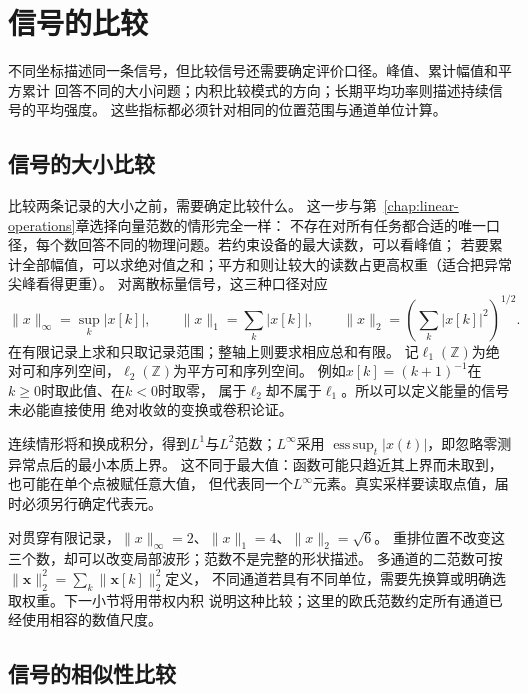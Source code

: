 \section{信号的比较}
\label{sec:signal-comparison}

不同坐标描述同一条信号，但比较信号还需要确定评价口径。峰值、累计幅值和平方累计
回答不同的大小问题；内积比较模式的方向；长期平均功率则描述持续信号的平均强度。
这些指标都必须针对相同的位置范围与通道单位计算。

\subsection{信号的大小比较}

比较两条记录的大小之前，需要确定比较什么。
这一步与第~\ref{chap:linear-operations}章选择向量范数的情形完全一样：
不存在对所有任务都合适的唯一口径，每个数回答不同的物理问题。若约束设备的最大读数，可以看峰值；
若要累计全部幅值，可以求绝对值之和；平方和则让较大的读数占更高权重（适合把异常尖峰看得更重）。
对离散标量信号，这三种口径对应
\[
  \|x\|_\infty=\sup_k|x[k]|,\qquad
  \|x\|_1=\sum_k|x[k]|,\qquad
  \|x\|_2=\left(\sum_k|x[k]|^2\right)^{1/2}.
\]
在有限记录上求和只取记录范围；整轴上则要求相应总和有限。
记$\ell_1(\mathbb Z)$为绝对可和序列空间，$\ell_2(\mathbb Z)$为平方可和序列空间。
例如$x[k]=(k+1)^{-1}$在$k\geq0$时取此值、在$k<0$时取零，
属于$\ell_2$却不属于$\ell_1$。所以可以定义能量的信号未必能直接使用
绝对收敛的变换或卷积论证。

连续情形将和换成积分，得到$L^1$与$L^2$范数；$L^\infty$采用
$\operatorname*{ess\,sup}_t|x(t)|$，即忽略零测异常点后的最小本质上界。
这不同于最大值：函数可能只趋近其上界而未取到，也可能在单个点被赋任意大值，
但代表同一个$L^\infty$元素。真实采样要读取点值，届时必须另行确定代表元。

对贯穿有限记录，$\|x\|_\infty=2$、$\|x\|_1=4$、$\|x\|_2=\sqrt6$。
重排位置不改变这三个数，却可以改变局部波形；范数不是完整的形状描述。
多通道的二范数可按
$\|\bm x\|_2^2=\sum_k\|\bm x[k]\|_2^2$定义，
不同通道若具有不同单位，需要先换算或明确选取权重。下一小节将用带权内积
说明这种比较；这里的欧氏范数约定所有通道已经使用相容的数值尺度。

\subsection{信号的相似性比较}

